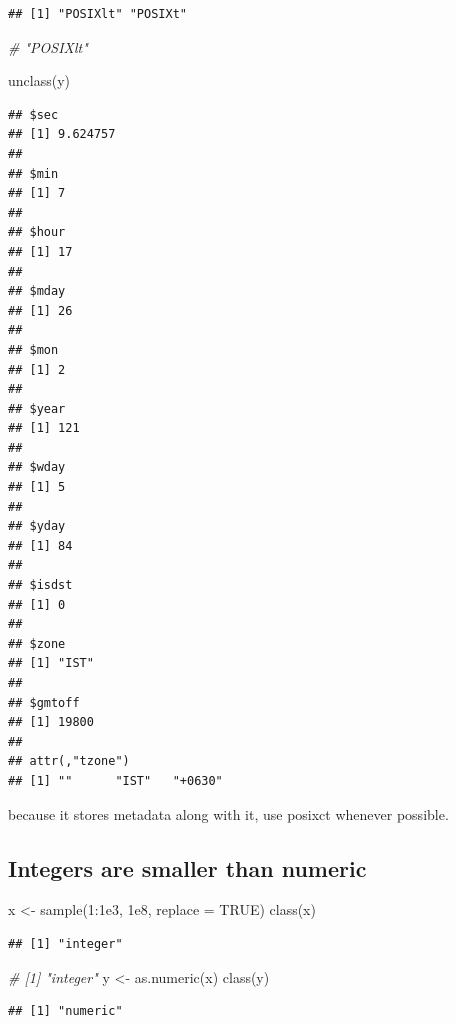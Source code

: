 \documentclass[
]{book}
\newenvironment{Shaded}{\begin{snugshade}}{\end{snugshade}}
\newcommand{\AttributeTok}[1]{\textcolor[rgb]{0.77,0.63,0.00}{#1}}
\newcommand{\CommentTok}[1]{\textcolor[rgb]{0.56,0.35,0.01}{\textit{#1}}}
\newcommand{\ConstantTok}[1]{\textcolor[rgb]{0.00,0.00,0.00}{#1}}
\newcommand{\DecValTok}[1]{\textcolor[rgb]{0.00,0.00,0.81}{#1}}
\newcommand{\FloatTok}[1]{\textcolor[rgb]{0.00,0.00,0.81}{#1}}
\newcommand{\FunctionTok}[1]{\textcolor[rgb]{0.00,0.00,0.00}{#1}}
\newcommand{\NormalTok}[1]{#1}
\newcommand{\OtherTok}[1]{\textcolor[rgb]{0.56,0.35,0.01}{#1}}
\newcommand{\SpecialCharTok}[1]{\textcolor[rgb]{0.00,0.00,0.00}{#1}}
\begin{document}
\begin{verbatim}
## [1] "POSIXlt" "POSIXt"
\end{verbatim}

\begin{Shaded}
\begin{Highlighting}[]
\CommentTok{\# "POSIXlt"}

\FunctionTok{unclass}\NormalTok{(y)}
\end{Highlighting}
\end{Shaded}

\begin{verbatim}
## $sec
## [1] 9.624757
## 
## $min
## [1] 7
## 
## $hour
## [1] 17
## 
## $mday
## [1] 26
## 
## $mon
## [1] 2
## 
## $year
## [1] 121
## 
## $wday
## [1] 5
## 
## $yday
## [1] 84
## 
## $isdst
## [1] 0
## 
## $zone
## [1] "IST"
## 
## $gmtoff
## [1] 19800
## 
## attr(,"tzone")
## [1] ""      "IST"   "+0630"
\end{verbatim}

because it stores metadata along with it, use posixct whenever possible.

\hypertarget{integers-are-smaller-than-numeric}{%
\subsection{Integers are smaller than numeric}\label{integers-are-smaller-than-numeric}}

\begin{Shaded}
\begin{Highlighting}[]
\NormalTok{x }\OtherTok{\textless{}{-}} \FunctionTok{sample}\NormalTok{(}\DecValTok{1}\SpecialCharTok{:}\FloatTok{1e3}\NormalTok{, }\FloatTok{1e8}\NormalTok{, }\AttributeTok{replace =} \ConstantTok{TRUE}\NormalTok{)}
\FunctionTok{class}\NormalTok{(x)}
\end{Highlighting}
\end{Shaded}

\begin{verbatim}
## [1] "integer"
\end{verbatim}

\begin{Shaded}
\begin{Highlighting}[]
\CommentTok{\# [1] "integer"}
\NormalTok{y }\OtherTok{\textless{}{-}} \FunctionTok{as.numeric}\NormalTok{(x)}
\FunctionTok{class}\NormalTok{(y)}
\end{Highlighting}
\end{Shaded}

\begin{verbatim}
## [1] "numeric"
\end{verbatim}
\end{document}
